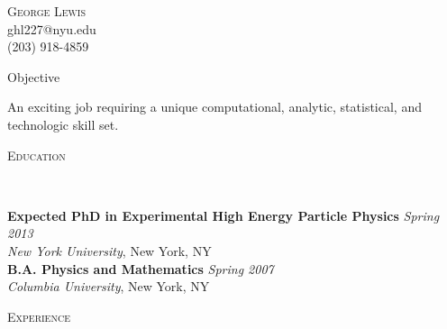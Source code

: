 \documentclass[9pt]{article}
\newenvironment{changemargin}[2]{%
  \begin{list}{}{%
    \setlength{\topsep}{0pt}%
    \setlength{\leftmargin}{#1}%
    \setlength{\rightmargin}{#2}%
    \setlength{\listparindent}{\parindent}%
    \setlength{\itemindent}{\parindent}%
    \setlength{\parsep}{\parskip}%
  }%
  \item[]}{\end{list}
}
\newcommand{\lineover}{
	\begin{changemargin}{-0.05in}{-0.05in}
		\vspace*{-8pt}
		\hrulefill \\
		\vspace*{-2pt}
	\end{changemargin}
}
\newcommand{\header}[1]{
	\begin{changemargin}{-0.5in}{-0.5in}
		\scshape{#1}\\
  	\lineover
	\end{changemargin}
}
\newcommand{\contact}[4]{
	\begin{changemargin}{-0.5in}{-0.5in}
		\begin{center}
			{\Large \scshape {#1}}\\ \smallskip
			{#2}\\ \smallskip 
			{#3}\\ \smallskip
			{#4}\smallskip
		\end{center}
	\end{changemargin}
}
\newenvironment{body} {
	\vspace*{-16pt}
	\begin{changemargin}{-0.25in}{-0.5in}
  }	
	{\end{changemargin}
}
\begin{document}
\contact{George Lewis}{ghl227@nyu.edu}{(203) 918-4859}


\header{Objective}

\begin{body}
	\vspace{14pt}
	An exciting job requiring a unique computational, analytic, statistical, and technologic skill set.
\end{body}

\smallskip


\header{Education}

\begin{body}
	\vspace{14pt}
	\textbf{Expected PhD in Experimental High Energy Particle Physics }{} \hfill \emph{Spring 2013}{} \\
	\emph{New York University}, New York, NY{} \\
  \medskip
	\textbf{B.A. Physics and Mathematics} \hfill \emph{Spring 2007} \\
	\emph{Columbia University}, New York, NY\\
\end{body}

\smallskip


\header{Experience}
\end{document}
